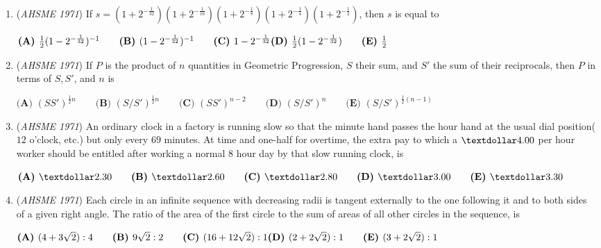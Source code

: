 \begin{enumerate}
 Quadrilateral $ABCD$ is inscribed in a circle with side $AD$, a diameter of length $4$. If sides $AB$ and $BC$ each have length $1$, 
then side $CD$ has length


 $\textbf{(A) }\frac{7}{2}\qquad \textbf{(B) }\frac{5\sqrt{2}}{2}\qquad \textbf{(C) }\sqrt{11}\qquad \textbf{(D) }\sqrt{13}\qquad \textbf{(E) }2\sqrt{3}$


	\item (\textit{AHSME 1971}) If $s=(1+2^{-\frac{1}{32}})(1+2^{-\frac{1}{16}})(1+2^{-\frac{1}{8}})(1+2^{-\frac{1}{4}})(1+2^{-\frac{1}{2}})$, then $s$ is equal to


 $\textbf{(A) }\textstyle{\frac{1}{2}}(1-2^{-\frac{1}{32}})^{-1}\qquad \textbf{(B) }(1-2^{-\frac{1}{32}})^{-1}\qquad \textbf{(C) }1-2^{-\frac{1}{32}}\qquad \\ \textbf{(D) }\textstyle{\frac{1}{2}}(1-2^{-\frac{1}{32}})\qquad  \textbf{(E) }\frac{1}{2}$


	\item (\textit{AHSME 1971}) If $P$ is the product of $n$ quantities in Geometric Progression, $S$ their sum, and $S'$ the sum of their reciprocals, 
then $P$ in terms of $S, S'$, and $n$ is


 $\textbf{(A) }(SS')^{\frac{1}{2}n}\qquad \textbf{(B) }(S/S')^{\frac{1}{2}n}\qquad \textbf{(C) }(SS')^{n-2}\qquad \textbf{(D) }(S/S')^n\qquad \textbf{(E) }(S/S')^{\frac{1}{2}(n-1)}$


	\item (\textit{AHSME 1971}) An ordinary clock in a factory is running slow so that the minute hand passes the hour hand at the usual dial position($12$ o'clock, etc.) 
but only every $69$ minutes. At time and one-half for overtime, the extra pay to which a $\textdollar 4.00$ per hour worker should be entitled 
after working a normal $8$ hour day by that slow running clock, is


 $\textbf{(A) }\textdollar 2.30\qquad \textbf{(B) }\textdollar 2.60\qquad \textbf{(C) }\textdollar 2.80\qquad \textbf{(D) }\textdollar 3.00\qquad \textbf{(E) }\textdollar 3.30$


	\item (\textit{AHSME 1971}) Each circle in an infinite sequence with decreasing radii is tangent externally to the one following it and to both sides of a given right angle. 
The ratio of the area of the first circle to the sum of areas of all other circles in the sequence, is


 $\textbf{(A) }(4+3\sqrt{2}):4\qquad \textbf{(B) }9\sqrt{2}:2\qquad \textbf{(C) }(16+12\sqrt{2}):1\qquad \\ \textbf{(D) }(2+2\sqrt{2}):1\qquad  \textbf{(E) }(3+2\sqrt{2}):1$


\end{enumerate}